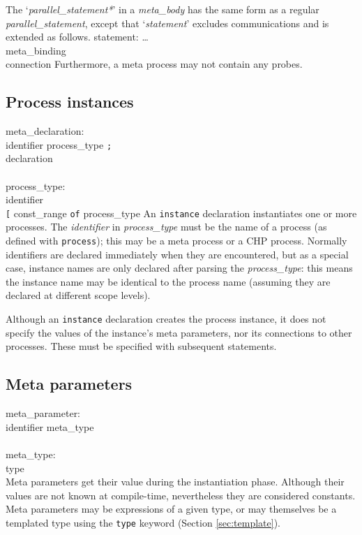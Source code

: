 The `{\it{}parallel\_statement*}' in a {\it{}meta\_body} has the same form as
a regular {\it{}parallel\_statement}, except that `{\it{}statement}' excludes
communications and is extended as follows.
\grammarstart
statement:
      \>\dots \\
\orbox \>meta\_binding \\
\orbox \>connection
\grammarend
Furthermore, a meta process may not contain any probes.


\subsection{Process instances}\label{sec:instance}

\grammarstart
meta\_declaration: \\
        identifier\LIST {\tt{}:} process\_type {\tt{};} \\
\orbox \>declaration \\
 \\
process\_type: \\
       \>identifier \\
\orbox {} {\tt{}[} const\_range\LIST {\tt{}]} {\tt{}of} process\_type
\grammarend
An {\tt{}instance} declaration instantiates one or more processes. The
{\it{}identifier} in {\it{}process\_type} must be the name of a process
(as defined with {\tt{}process}); this may be a meta process or a
CHP process. Normally identifiers are declared immediately when
they are encountered, but as a special case, instance names are only declared
after parsing the {\it{}process\_type}: this means the instance name
may be identical to the process name (assuming they are declared at
different scope levels).

Although an {\tt{}instance} declaration creates the
process instance, it does not specify the values of the instance's
meta parameters, nor its connections to other processes. These must be
specified with subsequent statements.


\subsection{Meta parameters}\label{sec:metaparam}

\grammarstart
meta\_parameter: \\
      \>identifier\LIST {\tt{}:} meta\_type \\
 \\
meta\_type: \\
      \>type \\
\grammarend
Meta parameters get their value during the instantiation phase. Although
their values are not known at compile-time, nevertheless they are considered
constants.  Meta parameters may be expressions of a given type, or may themselves
be a templated type using the {\tt{}type} keyword (Section \ref{sec:template}).

